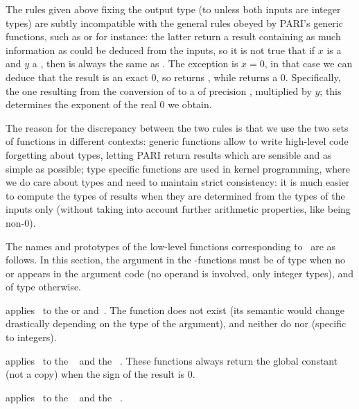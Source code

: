  The rules given above fixing the output
type (to  unless both inputs are integer types) are subtly
incompatible with the general rules obeyed by PARI's generic functions, such
as  or  for instance: the latter return a result
containing as much information as could be deduced from the inputs, so it is
not true that if $x$ is a  and $y$ a , then
 is always the same as . The exception
is $x = 0$, in that case we can deduce that the result is an exact $0$,
so  returns , while  returns a
 $0$. Specifically, the one resulting from the conversion of
 to a  of precision , multiplied by
$y$; this determines the exponent of the real $0$ we obtain.

The reason for the discrepancy between the two rules is that we use the two
sets of functions in different contexts: generic functions allow to write
high-level code forgetting about types, letting PARI return results which are
sensible and as simple as possible; type specific functions are used in
kernel programming, where we do care about types and need to maintain strict
consistency: it is much easier to compute the types of results when they are
determined from the types of the inputs only (without taking into account
further arithmetic properties, like being non-0).
\smallskip

The names and prototypes of the low-level functions corresponding
to \op\ are as follows. In this section, the  argument in the
-functions must be of type  when no  or 
appears in the argument code (no  operand is involved, only integer
types), and of type  otherwise.

 applies \op\ to
the  or   and~. The function
 does not exist (its semantic would change drastically
depending on the type of the  argument), and neither do
 nor  (specific to integers).

 applies \op\ to the
~ and the ~.
 These functions always return the global constant
 (not a copy) when the sign of the result is $0$.

 applies \op\ to the
~ and the ~.

